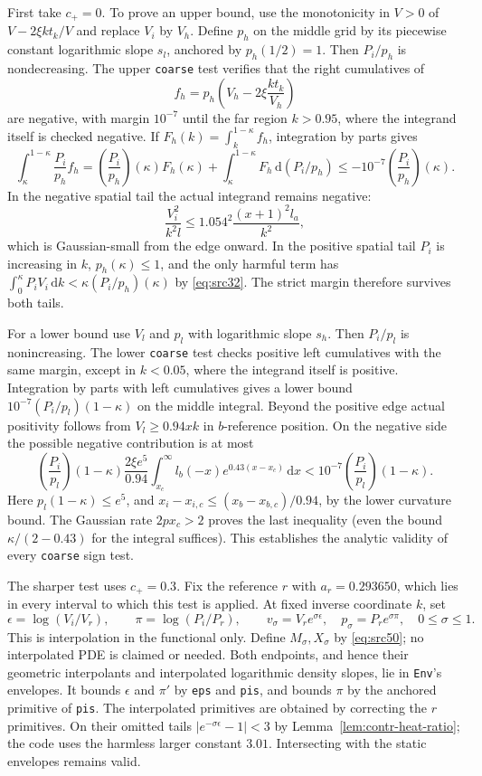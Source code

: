 \documentclass[11pt,a4paper]{article}
\numberwithin{equation}{section}
\theoremstyle{definition}
\theoremstyle{remark}
\newcommand{\dd}{\mathrm d}
\begin{document}
First take $c_+=0$.  To prove an upper bound, use the monotonicity in
$V>0$ of $V-2\xi kt_k/V$ and replace $V_i$ by $V_h$.  Define $p_h$
on the middle grid by its piecewise constant logarithmic slope
$s_l$, anchored by $p_h(1/2)=1$.  Then $P_i/p_h$ is nondecreasing.
The upper \texttt{coarse} test verifies that the right cumulatives
of
\[
 f_h=p_h\left(V_h-2\xi\frac{kt_k}{V_h}\right)
\]
are negative, with margin $10^{-7}$ until the far region $k>0.95$,
where the integrand itself is checked negative.  If
$F_h(k)=\int_k^{1-\kappa}f_h$, integration by parts gives
\[
 \int_\kappa^{1-\kappa}\frac{P_i}{p_h}f_h
 =\left(\frac{P_i}{p_h}\right)(\kappa)F_h(\kappa)
  +\int_\kappa^{1-\kappa}F_h\,\dd(P_i/p_h)
 \le-10^{-7}\left(\frac{P_i}{p_h}\right)(\kappa).
\]
In the negative spatial tail the actual integrand remains negative:
\[
 \frac{V_i^2}{k^2l}
 \le1.054^2\frac{(x+1)^2l_a}{k^2},
\]
which is Gaussian-small from the edge onward.  In the positive
spatial tail $P_i$ is increasing in $k$, $p_h(\kappa)\le1$, and
the only harmful term has
$\int_0^\kappa P_iV_i\,\dd k
 <\kappa(P_i/p_h)(\kappa)$ by \eqref{eq:src32}.  The strict margin
therefore survives both tails.

For a lower bound use $V_l$ and $p_l$ with logarithmic slope $s_h$.
Then $P_i/p_l$ is nonincreasing.  The lower \texttt{coarse} test
checks positive left cumulatives with the same margin, except in
$k<0.05$, where the integrand itself is positive.  Integration by
parts with left cumulatives gives a lower bound
$10^{-7}(P_i/p_l)(1-\kappa)$ on the middle integral.
Beyond the positive edge actual positivity follows from
$V_l\ge0.94xk$ in $b$-reference position.  On the negative side the
possible negative contribution is at most
\[
 \left(\frac{P_i}{p_l}\right)(1-\kappa)
 \frac{2\xi e^5}{0.94}
 \int_{x_c}^\infty l_b(-x)e^{0.43(x-x_c)}\,\dd x
 <10^{-7}\left(\frac{P_i}{p_l}\right)(1-\kappa).
\]
Here $p_l(1-\kappa)\le e^5$, and
$x_i-x_{i,c}\le(x_b-x_{b,c})/0.94$, by the lower curvature bound.
The Gaussian rate $2px_c>2$ proves the last inequality (even the
bound $\kappa/(2-0.43)$ for the integral suffices).
This establishes the analytic validity of every \texttt{coarse}
sign test.

The sharper test uses $c_+=0.3$.  Fix the reference $r$ with
$a_r=0.293650$, which lies in every interval to which this test is
applied.  At fixed inverse coordinate $k$, set
\[
 \epsilon=\log(V_i/V_r),\qquad
 \pi=\log(P_i/P_r),\qquad
 v_\sigma=V_re^{\sigma\epsilon},\quad
 p_\sigma=P_re^{\sigma\pi},\quad 0\le\sigma\le1.
\]
This is interpolation in the functional only.  Define
$M_\sigma,X_\sigma$ by \eqref{eq:src50}; no interpolated PDE is
claimed or needed.  Both endpoints, and hence their geometric
interpolants and interpolated logarithmic density slopes, lie in
\texttt{Env}'s envelopes.  It bounds $\epsilon$ and $\pi'$ by
\texttt{eps} and \texttt{pis}, and bounds $\pi$ by the anchored
primitive of \texttt{pis}.  The interpolated primitives are obtained
by correcting the $r$ primitives.  On their omitted tails
$|e^{-\sigma\epsilon}-1|<3$ by
Lemma~\ref{lem:contr-heat-ratio}; the code uses the harmless larger
constant $3.01$.  Intersecting with the static envelopes remains
valid.
\end{document}
